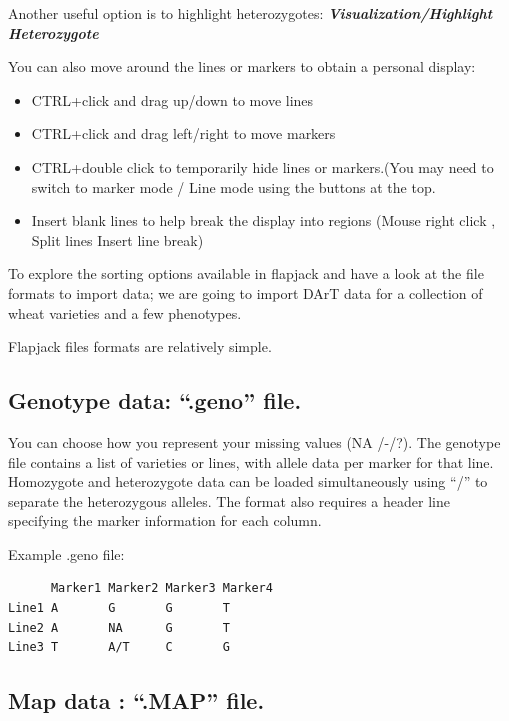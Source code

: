 \documentclass[
]{book}
\providecommand{\tightlist}{%
  \setlength{\itemsep}{0pt}\setlength{\parskip}{0pt}}
\begin{document}
Another useful option is to highlight heterozygotes: \textbf{\emph{Visualization/Highlight Heterozygote}}

You can also move around the lines or markers to obtain a personal display:

\begin{itemize}
\tightlist
\item
  CTRL+click and drag up/down to move lines
\item
  CTRL+click and drag left/right to move markers
\item
  CTRL+double click to temporarily hide lines or markers.(You may need to switch to marker mode / Line mode using the buttons at the top.
\item
  Insert blank lines to help break the display into regions (Mouse right click , Split lines Insert line break)
\end{itemize}

To explore the sorting options available in flapjack and have a look at the file formats to import data; we are going to import DArT data for a collection of wheat varieties and a few
phenotypes.

Flapjack files formats are relatively simple.

\hypertarget{genotype-data-.geno-file.}{%
\subsection{Genotype data: ``.geno'' file.}\label{genotype-data-.geno-file.}}

You can choose how you represent your missing values (NA /-/?). The genotype file contains a list of varieties or lines, with allele data per marker for that line. Homozygote and heterozygote data can be loaded simultaneously using ``/'' to separate the heterozygous alleles. The format also requires a header line specifying the marker information for each column.

Example .geno file:

\begin{verbatim}
      Marker1 Marker2 Marker3 Marker4
Line1 A       G       G       T
Line2 A       NA      G       T
Line3 T       A/T     C       G
\end{verbatim}

\hypertarget{map-data-.map-file.}{%
\subsection{Map data : ``.MAP'' file.}\label{map-data-.map-file.}}
\end{document}
